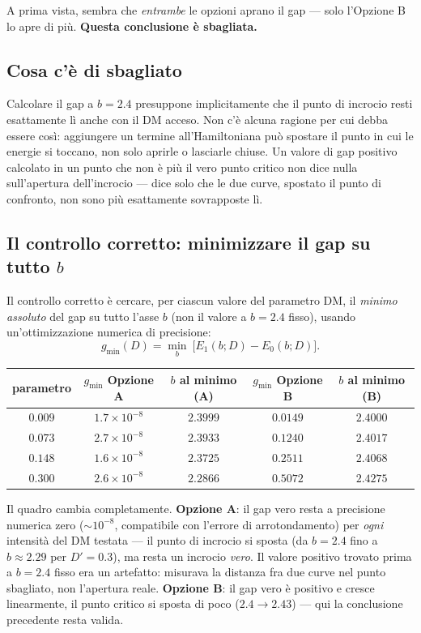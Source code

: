 \documentclass[11pt,a4paper]{article}
\begin{document}
A prima vista, sembra che \emph{entrambe} le opzioni aprano il gap — solo l'Opzione B
lo apre di più. \textbf{Questa conclusione è sbagliata.}

\subsection{Cosa c'è di sbagliato}

Calcolare il gap a $b=2.4$ presuppone implicitamente che il punto di incrocio resti
esattamente lì anche con il DM acceso. Non c'è alcuna ragione per cui debba essere
così: aggiungere un termine all'Hamiltoniana può spostare il punto in cui le energie
si toccano, non solo aprirle o lasciarle chiuse. Un valore di gap positivo calcolato
in un punto che non è più il vero punto critico non dice nulla sull'apertura
dell'incrocio — dice solo che le due curve, spostato il punto di confronto, non sono
più esattamente sovrapposte lì.

\subsection{Il controllo corretto: minimizzare il gap su tutto $b$}

Il controllo corretto è cercare, per ciascun valore del parametro DM, il \emph{minimo
assoluto} del gap su tutto l'asse $b$ (non il valore a $b=2.4$ fisso), usando
un'ottimizzazione numerica di precisione:
\[
g_\text{min}(D) = \min_b\ \big[E_1(b;D) - E_0(b;D)\big].
\]

\begin{center}
\renewcommand{\arraystretch}{1.3}
\begin{tabular}{ccccc}
\toprule
parametro & $g_\text{min}$ Opzione A & $b$ al minimo (A) & $g_\text{min}$ Opzione B & $b$ al minimo (B) \\
\midrule
$0.009$ & $1.7\times10^{-8}$ & $2.3999$ & $0.0149$ & $2.4000$ \\
$0.073$ & $2.7\times10^{-8}$ & $2.3933$ & $0.1240$ & $2.4017$ \\
$0.148$ & $1.6\times10^{-8}$ & $2.3725$ & $0.2511$ & $2.4068$ \\
$0.300$ & $2.6\times10^{-8}$ & $2.2866$ & $0.5072$ & $2.4275$ \\
\bottomrule
\end{tabular}
\end{center}

Il quadro cambia completamente. \textbf{Opzione A}: il gap vero resta a
precisione numerica zero ($\sim10^{-8}$, compatibile con l'errore
di arrotondamento) per \emph{ogni} intensità del DM testata — il punto di incrocio si
sposta (da $b=2.4$ fino a $b\approx2.29$ per $D'=0.3$), ma resta un incrocio
\emph{vero}. Il valore positivo trovato prima a $b=2.4$ fisso era un artefatto:
misurava la distanza fra due curve nel punto sbagliato, non l'apertura reale.
\textbf{Opzione B}: il gap vero è positivo e cresce linearmente, il punto critico si
sposta di poco ($2.4\to2.43$) — qui la conclusione precedente resta valida.
\end{document}
